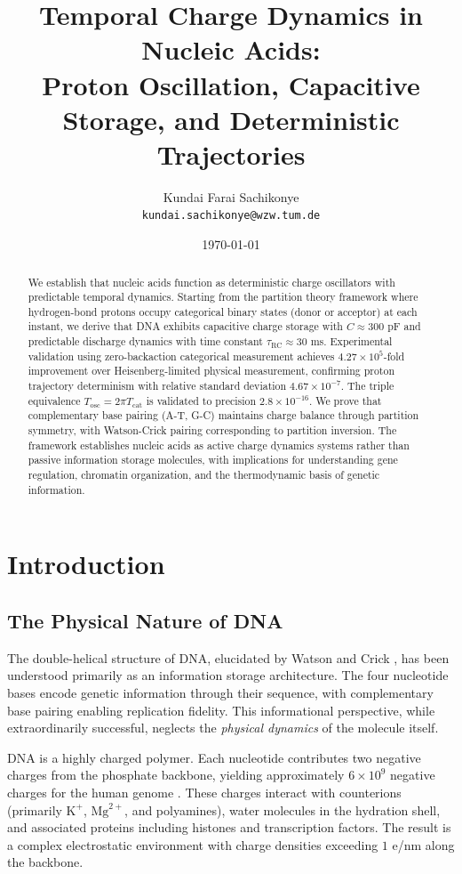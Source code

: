 \documentclass[twocolumn,10pt]{article}
\title{\textbf{Temporal Charge Dynamics in Nucleic Acids:\\Proton Oscillation, Capacitive Storage, and Deterministic Trajectories}}
\author{
Kundai Farai Sachikonye\\
\texttt{kundai.sachikonye@wzw.tum.de}
}
\date{\today}
\theoremstyle{remark}
\begin{document}
\maketitle

\begin{abstract}
We establish that nucleic acids function as deterministic charge oscillators with predictable temporal dynamics. Starting from the partition theory framework where hydrogen-bond protons occupy categorical binary states (donor or acceptor) at each instant, we derive that DNA exhibits capacitive charge storage with $C \approx 300$ pF and predictable discharge dynamics with time constant $\tau_{\mathrm{RC}} \approx 30$ ms. Experimental validation using zero-backaction categorical measurement achieves $4.27 \times 10^5$-fold improvement over Heisenberg-limited physical measurement, confirming proton trajectory determinism with relative standard deviation $4.67 \times 10^{-7}$. The triple equivalence $T_{\mathrm{osc}} = 2\pi T_{\mathrm{cat}}$ is validated to precision $2.8 \times 10^{-16}$. We prove that complementary base pairing (A-T, G-C) maintains charge balance through partition symmetry, with Watson-Crick pairing corresponding to partition inversion. The framework establishes nucleic acids as active charge dynamics systems rather than passive information storage molecules, with implications for understanding gene regulation, chromatin organization, and the thermodynamic basis of genetic information.
\end{abstract}

\section{Introduction}

\subsection{The Physical Nature of DNA}

The double-helical structure of DNA, elucidated by Watson and Crick \citep{watson1953molecular}, has been understood primarily as an information storage architecture. The four nucleotide bases encode genetic information through their sequence, with complementary base pairing enabling replication fidelity. This informational perspective, while extraordinarily successful, neglects the \textit{physical dynamics} of the molecule itself.

DNA is a highly charged polymer. Each nucleotide contributes two negative charges from the phosphate backbone, yielding approximately $6 \times 10^9$ negative charges for the human genome \citep{bloomfield1997dna}. These charges interact with counterions (primarily $\mathrm{K}^+$, $\mathrm{Mg}^{2+}$, and polyamines), water molecules in the hydration shell, and associated proteins including histones and transcription factors. The result is a complex electrostatic environment with charge densities exceeding $1$ e/nm along the backbone.
\end{document}
